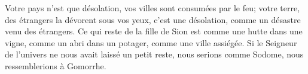 Votre pays n’est que désolation, vos villes sont consumées par le feu;
	votre terre, des étrangers la dévorent sous vos yeux,
	c’est une désolation, comme un désastre venu des étrangers.
Ce qui reste de la fille de Sion est comme une hutte dans une vigne,
	comme un abri dans un potager,
	comme une ville assiégée.
Si le Seigneur de l’univers ne nous avait laissé un petit reste,
	nous serions comme Sodome, nous ressemblerions à Gomorrhe.
